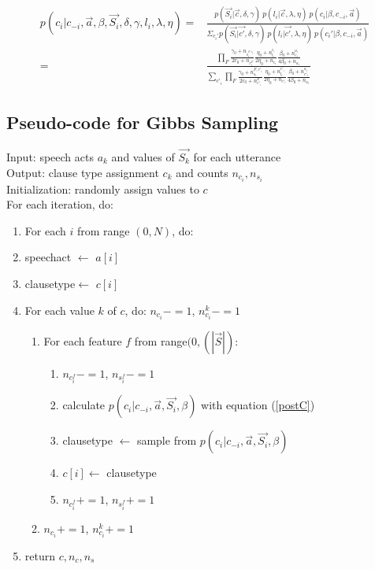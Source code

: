 \begin{equation}\label{postC}
\begin{split}
p(c_{i}| c_{-i}, \vec{a}, \beta, \vec{S_{i}}, \delta, \gamma, l_{i}, \lambda, \eta) = &
\frac{p(\vec{S_{i}}| \vec{c}, \delta, \gamma)\ p(l_{i} |\vec{c},\lambda, \eta)\ p(c_{i}|\beta, c_{-i}, \vec{a})}{\Sigma_{c_{i}'}p(\vec{S_{i}}| \vec{c'}, \delta, \gamma)\ p(l_{i} |\vec{c'},\lambda, \eta)\ p(c_{i}'|\beta, c_{-i}, \vec{a})}\\
=& \frac{ \prod_{F}\frac{\gamma_{0}+n_{s^{F, c_{i}}_{i}}}{2r_{0}+n_{c^{F}_{i}}}%
\frac{\eta_{0}+n_{l_{i}}^{c_{i}}}{2\eta_{0}+n_{c_{i}}}%
\frac{\beta_{0}+n_{c_{i}}^{a_{i}}}{4\beta_{0}+n_{a_{i}}}%
}%
{\sum_{c'_{i}}\prod_{F}\frac{\gamma_{0}+n^{F, c'_{i}}_{s_{i}}}{2r_{0}+n^{F}_{c'_{i}}}%
\frac{\eta_{0}+n_{l_{i}}^{c'_{i}}}{2\eta_{0}+n_{c'_{i}}}%
\frac{\beta_{0}+n_{c'_{i}}^{a_{i}}}{4\beta_{0}+n_{a_{i}}} %
}%
\end{split}
\end{equation}

\subsection{Pseudo-code for Gibbs Sampling}

Input: speech acts $a_{k}$ and values of $\vec{S_{k}}$ for each utterance\\
Output: clause type assignment $c_{k}$ and counts $n_{c_{i}}, n_{s_{i}}$\\
Initialization: randomly assign values to $c$\\
For each iteration, do:  
\begin{enumerate}
\item For each $i$ from range $(0,N)$, do:
\item speechact $\leftarrow$ $a[i]$
\item clausetype$\leftarrow$ $c[i]$ 
\item For each value $k$ of $c$, do:
$n_{c_{i}} -= 1$, $n^{k}_{c_{i}} -=1$
\begin{enumerate}
\item For each feature $f$ from range$(0, (|\vec{S}|)$:
\begin{enumerate}
\item $n_{c_{i}^{f}} -= 1$, $n_{s_{i}^{f}} -= 1$
\item calculate  $p(c_{i}| c_{-i}, \vec{a}, \vec{S_{i}}, \beta )$ with equation (\ref{postC})
\item clausetype $\leftarrow$ sample from $ p(c_{i}| c_{-i}, \vec{a}, \vec{S_{i}}, \beta )$
\item $c[i]\leftarrow$ clausetype
\item $n_{c_{i}^{f}} += 1$, $n_{s_{i}^{f}} += 1$
\end{enumerate}
\item $n_{c_{i}} += 1$, $n^{k}_{c_{i}} +=1$
\end{enumerate}
\item return $c, n_{c}, n_{s}$
\end{enumerate}





